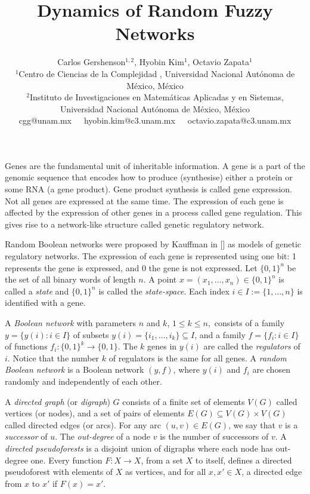 \documentclass[letterpaper]{article}
\title{Dynamics of Random Fuzzy Networks}
\author{Carlos Gershenson$^{1,2}$, Hyobin Kim$^1$, Octavio Zapata$^1$
\mbox{}\\
$^1$Centro de Ciencias de la Complejidad , Universidad Nacional Aut\'onoma de M\'exico, M\'exico \\
$^2$Instituto de Investigaciones en Matem\'aticas Aplicadas y en Sistemas, Universidad Nacional Aut\'onoma de M\'exico, M\'exico \\
cgg@unam.mx\ \ \ 
hyobin.kim@c3.unam.mx\ \ \ 
octavio.zapata@c3.unam.mx} %
\begin{document}
\maketitle
Genes are the fundamental unit of inheritable information. 
A gene is a part of the genomic sequence that encodes how to produce (synthesise) either a protein or some RNA (a gene product). 
Gene product synthesis is called gene expression. 
Not all genes are expressed at the same time.
The expression of each gene is affected by the expression of other genes in a process called gene regulation. 
This gives rise to a network-like structure called genetic regulatory network. %

Random Boolean networks were proposed by Kauffman in [] as models of genetic regulatory networks.
 The expression of each gene is represented using one bit: 1 represents the gene is expressed, and 0  the gene is not expressed.
Let $\{0,1\}^n$ be the set of all binary words of length $n$. A point $x=(x_1,\dots, x_n)\in \{0,1\}^n$ is called  a \emph{state} and $\{0,1\}^n$ is called the \emph{state-space}. Each index $i\in I:=\{1,\dots,n\}$ is identified with a gene.

A \emph{Boolean network} with parameters $n$ and $k$, $1\leq k\leq n,$ 
consists of a family 
$y=\{y(i):i\in I\}$
of
subsets $y(i)=\{i_1,\dots,i_k\}\subseteq I$, and a family $f=\{f_i: i\in I\}$ of functions $f_i\colon \{0,1\}^{k}\rightarrow \{0,1\}$. 
The $k$ genes in $y(i)$ are called the \emph{regulators} of $i$.
Notice that the number $k$ of regulators is the same for all genes.
A \emph{random Boolean network} is a Boolean network $(y,f)$, where   $y(i)$ and $f_i$ are chosen randomly and  independently of each other. %

A \emph{directed graph} (or \emph{digraph}) $G$ consists of a finite set of elements $V(G)$ called vertices (or nodes), and a set of pairs of elements $E(G)\subseteq V(G)\times V(G)$ called directed edges (or arcs).  
For any arc $(u,v)\in E(G)$, we say that $v$ is a \emph{successor} of $u$. 
The \emph{out-degree} of a node $v$ is the number %
 of successors of $v$. 
A \emph{directed pseudoforests} is a disjoint union of digraphs where each node has out-degree one. 
Every function $F\colon X\to X$,  from a set $X$ to itself, defines a directed pseudoforest with elements of $X$
as vertices, and for all $x,x'\in X$, a directed edge from $x$ to $x'$ if $F(x)=x'$.
\end{document}
